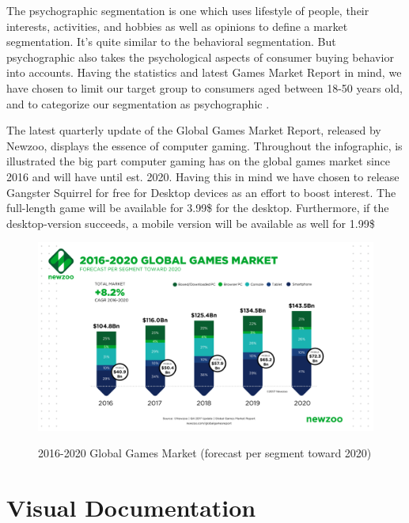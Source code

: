 \documentclass[12p]{article}
\begin{document}
The psychographic segmentation is one which uses lifestyle of people, their interests, activities, and hobbies as well as opinions to define a market segmentation. It’s quite similar to the behavioral segmentation. But psychographic also takes the psychological aspects of consumer buying behavior into accounts. Having the statistics and latest Games Market Report in mind, we have chosen to limit our target group to consumers aged between 18-50 years old, and to categorize our segmentation as psychographic \cite{MarketSegmentation}.

The latest quarterly update of the Global Games Market Report, released by Newzoo, displays the essence of computer gaming. Throughout the infographic, is illustrated the big part computer gaming has on the global games market since 2016 and will have until est. 2020. Having this in mind we have chosen to release Gangster Squirrel for free for Desktop devices as an effort to boost interest. The full-length game will be available for 3.99\$ for the desktop. Furthermore, if the desktop-version succeeds, a mobile version will be available as well for 1.99\$

\begin{figure}[ht]
  \center
  \includegraphics[width=1\textwidth]{BusinessStrategy/GlobalGamesMarket2016-2020.png}
  \label{GlobalGamesMarket2016-2020}
  \caption{2016-2020 Global Games Market (forecast per segment toward 2020) \cite{GlobalGamesMarket}}
\end{figure}


\clearpage
\section{Visual Documentation} \label{VisualDocumentation}
\end{document}
